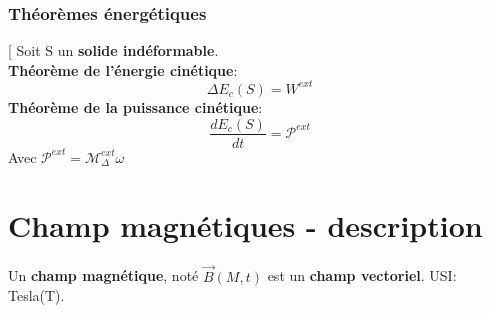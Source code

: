 \documentclass[12pt,hidelinks]{article}
\begin{document}
        \subsubsection{Théorèmes énergétiques}
            \begin{DashedDefinition}{}[
            Soit S un \textbf{solide indéformable}. \\
            \textbf{Théorème de l'énergie cinétique}:
            \[\Delta E_c(S) = W^{ext}\]
            \textbf{Théorème de la puissance cinétique}:
            \[ \frac{d E_c(S)}{dt} = \mathcal{P}^{ext}\]
            Avec $\mathcal{P}^{ext} = \mathcal{M}_\Delta^{ext} \omega$
            \end{DashedDefinition}
\newpage
\section{Champ magnétiques - description}
\vspace{3cm}
    Un \textbf{champ magnétique}, noté $\vec B(M,t)$ est un \textbf{champ vectoriel}. USI: Tesla(T).
\end{document}
